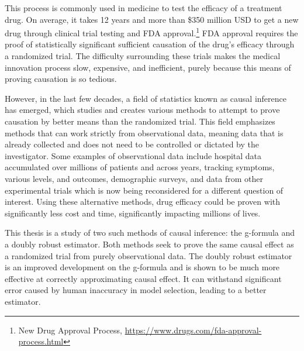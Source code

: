  This process is commonly used in medicine to test the efficacy of a treatment drug.  On average, it takes 12 years and more than \$350 million USD to get a new drug through clinical trial testing and FDA approval.\footnote{New Drug Approval Process, \url{https://www.drugs.com/fda-approval-process.html}}  FDA approval requires the proof of statistically significant sufficient causation of the drug's efficacy through a randomized trial.  The difficulty surrounding these trials makes the medical innovation process slow, expensive, and inefficient, purely because this means of proving causation is so tedious.  
 
However, in the last few decades, a field of statistics known as causal inference has emerged, which studies and creates various methods to attempt to prove causation by better means than the randomized trial.  This field emphasizes methods that can work strictly from observational data, meaning data that is already collected and does not need to be controlled or dictated by the investigator.  Some examples of observational data include hospital data accumulated over millions of patients and across years, tracking symptoms, various levels, and outcomes, demographic surveys, and data from other experimental trials which is now being reconsidered for a different question of interest.  Using these alternative methods, drug efficacy could be proven with significantly less cost and time, significantly impacting millions of lives.  

This thesis is a study of two such methods of causal inference: the g-formula and a doubly robust estimator.  Both methods seek to prove the same causal effect as a randomized trial from purely observational data.  The doubly robust estimator is an improved development on the g-formula and is shown to be much more effective at correctly approximating causal effect.  It can withstand significant error caused by human inaccuracy in model selection, leading to a better estimator.  




